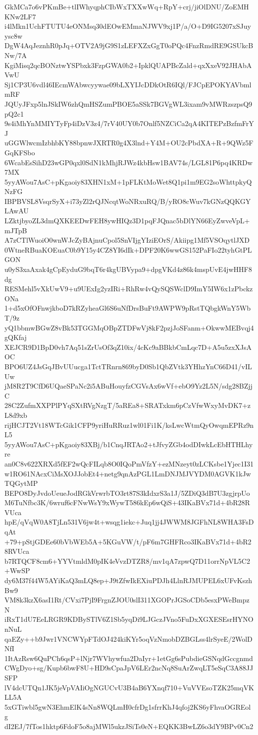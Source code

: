 GkMCa7o6vPKmBe+tlIWhyqphCIbWxTXXwWq+RpY+crj/jiOlDNU/ZoEMHKNw2LF7
i4lMkn1UchFTUTU4eONMsq30dEOwEMmaNJWV9xj1P/a/O+D9IG5207xSJuyysc8w
DgW4AqJeznhR0pJq+OTV2A9jG9S1zLEFXZxGgT0oPQc4FnzRmdRE9GSUkcBNw/7A
KgiMisq2qcBONztwYSPbxk3FzpGWA0b2+IpklQUAPBcZald+qxXxeV92JHAbAVwU
Sj1CP3U6vdl46IEcmWAbwcyywae09bLXYIJcDDkOtR6IQl/FJCpEPOKYAVbmlmRF
JQUyJFxp5lnJSkIW6zhQmHSZumPBOE5aSSk7BGVgWL3ixam9vMWRzszpsQ9pQ2c1
9s4iMhYnMMIYTyFp4iDzV3z4/7rV40UY0b7Onlf5NZCiCa2qA4KITEPzBzfmFrYJ
uGGWlwcmIzbhbKY88bpnwJXRTR0g4X3lnd+Y4M+OU2cPbdXA+R+9QWz5FGqKFSbo
6WcabEsSihD23wGP0qxl0SdN1kMhjRJWz4kbHsw1BAV74s/LGL81P6pq4KRDw7MX
5yyAWou7AsC+pKgaoiy83XHN1xM+1pFLKtMoWet8Q1pi1m9EG2soWhttpkyQNzFG
IBPBVSL8VsqrSyX+i73yZl2rQJNcqtWoNRxuRQ/B/yRO8cWuv7kGNzQQKGYLAwAU
LZktjbyoZL3dmQXKEEDwFEH8ywHIQz3D1pqFJQnac5bDlYN66EyZwveVpL+mJTpB
A7zCTlWuoiO0wnWJcZyBAjnuCpol5SnVIjgYIziEOrS/Akiipg1Mf5VSOqytlJXD
0WtneRBuaKOEuaC0b9Y15y4CZ8YI6dIk+DPF20K6wwGS152PaFIo22tyhGtPLGON
u0yS3xaAxak4gCpEyduG9bqT6r4kgUBVypa9+dpgVKd4z86k4mspUvE4jwHHF8dg
RESMehl5vXkUwV9+u9UExIg2yzIRi+RhRw4vQySQSWclD9ImY5IW6x1zPbckzONa
1+d5xOfOFnwjkboD7kRZyheaGl6S6uNfDrsBuFt9AWPW9pRstTQbgkWnY5WbT/9z
yQ1bbmwBGwZ8vBk53TGGMqOBpZTDFwVj8kF2pzjJoSFanm+OkwwMEBvqj4gQKfaj
XEJCR9D1BpD0vh7Aq51sZrUsOf3qZ10ix/4cKc9aBBkbCmLqc7D+A5u5zxXJsAOC
BPO6UZ4JsGqJBvUUucga1TctTRnrn869byD0Sb1QbZVtk3YHhzYnC66D41/vILUw
jM8R2T9CfD6UQaeSPaNc2i5ABuHouyfzCGVsAx6wVf+ebO9Yz2L5N/sdg28BZjjC
28C2ZufmXXPPlPYqSXtRVgNzgT/5aREa8+SRATxkm6pCzVfwWxyMvDK7+zL8d9xb
rijHCJT2Vt18WTcGik1CFP9yriHuRRuz1wl01Fi1K/ksLwcWtmQyOwqmEPRz9nL5
5yyAWou7AsC+pKgaoiy83XBj/b1CnqJRTAo2+tJfvyZGb4odDIwkLcEbHTHLhyre
an0C8v622XRXd5fEF2wQcFILqb8O0IQoPmVfzY+ezMNzeyt0zLCKsbe1Yjec1I31
w1RO61NAcxCiMsXOJJobEt4+netg9qnAzPGL1LmDNJMJVYDM0AGVK1kJwTQGytMP
BEPO8DyJvdoUeueJodRGkVrwrbTO3rt87S3kIdxrS3a1J/5ZDiQ3dB7U3zgjrpUo
M6TuNfbc3K/6wruf6cFNwWsY9xWywT586kEp6wQiS+43IKaBVx71d+4bR28RVUca
hpE/qVqW0A8TjLn531V6jw4t+wsqg1iekc+Juq1jj4JWWM8JGFhNL8WHA3FsDqAt
+79+pStjGDEe60bVbWEb5A+5KGuVW/t/pF6m7GHFRco3IKaBVx71d+4bR28RVUca
b7RTQCF8cm6+YYVtmldM0pIK4eVvzDTZR8/mv1qA7zpwQ7D11orrNpVL5C2+WwSP
dy6M37f44W5AYiKaQ3mLQ8ep+J9tZfwIkEXiuPDJh4LlnRJMUPEL6xUFvKszhBw9
VM8k3kzX6asI1Rt/CVxi7PjI9FrgnZJOU0slI311XGOPrJGSoCDb5esxPWeBmpzN
iRxT1dU7EeLRGR9KDBySTlV6Z1Sb5yqDi9LJGczJVno5FuDxXGXESEsrHYNOnNuL
qaEZy++b9Jwr1VNCWYpFTdOJ424kiKYr5oqVzNmobDZBGLss4lrSyeE/2WolDNfI
1ItAzRsw6QuPCh6qsP+lNjr7WVhywfua2DaIyr+1etGg6sPubdieGSNqdGccgnmd
CWgDyo+sg/Kupb6bwF8U+HD9sCpaJpV6LEr2ncNq8SuArZwqLT5eSqC3A88JJSFP
lV4dcUTQn1JK5jeVpVAIiOgNGUCvU3B4aB6YXnqf710+VuVVEsoTZK25mqVKLL5A
5xGTiwbl5gwN3EhmElK4sNn8WQLmH0cfrDg1sfrrKhJ4qfoj2KS6yFhvaOGREolg
dI2EJ/7fTos1hktp6FdoF5o8ajMWl5ukzJSiTs0eN+EQKK3BwLZ6o3dY9BPv0Cn2
